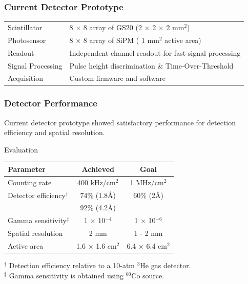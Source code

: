 \documentclass[xcolor=x11names, compress, handout]{beamer}
\renewcommand{\(}{\begin{columns}}
\renewcommand{\)}{\end{columns}}
\newcommand{\<}[1]{\begin{column}{#1}}
\renewcommand{\>}{\end{column}}
\begin{document}
\begin{frame}
  \frametitle{Current Detector Prototype}
  \begin{tabular}{l l}
  Scintillator & 8 $\times$ 8 array of GS20 (2 $\times$ 2 $\times$ 2 mm$^2$)  \\
  Photosensor & 8 $\times$ 8 array of SiPM ( 1 mm$^2$ active area) \\
  Readout & Independent channel readout for fast signal processing \\
  Signal Processing & Pulse height discrimination \& Time-Over-Threshold \\
  Acquisition & Custom firmware and software \\
  \end{tabular}

  \begin{center}
  \end{center}
\end{frame}

\begin{frame}[c]
  \frametitle{Detector Performance }
  Current detector prototype showed satisfactory performance for detection efficiency and spatial resolution.  \\

  \begin{block}{Evaluation}
  \centering
  \begin{tabular}{l c c }
  \hline
  Parameter & Achieved & Goal \\
  \hline
  Counting rate & 400 kHz/cm$^2$ & 1 MHz/cm$^2$\\
  Detector efficiency$^\dagger$ & \textcolor{dgreen}{74\% (1.8\AA)} & 60\% (2\AA) \\
   & \textcolor{dgreen}{92\% (4.2\AA)} & \\
  Gamma sensitivity$^\ddagger$ & 1 $\times$ 10$^{-4}$ & 1 $\times$ 10$^{-6}$\\
  Spatial resolution & \textcolor{dgreen}{2 mm} & 1 - 2 mm \\
  Active area & 1.6 $\times$ 1.6 cm$^2$ & 6.4 $\times$ 6.4 cm$^2$\\
  \hline
  \end{tabular}

  \scriptsize $^\dagger$ Detection efficiency relative to a 10-atm $^3$He gas detector. \\
  $^\ddagger$ Gamma sensitivity is obtained using $^{60}$Co source.
    \end{block}



\end{frame}
\end{document}
